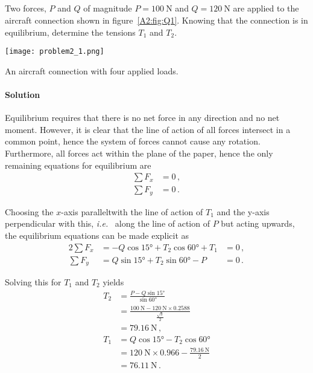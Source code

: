\documentclass[a4paper,justified,oneside]{tufte-handout}
\numberwithin{equation}{subsection}
\begin{document}
\subsection{}
Two forces, $P$ and $Q$ of magnitude $P=\SI{100}{\N}$ and $Q=\SI{120}{\N}$ are applied to the aircraft connection shown in figure~\ref{A2:fig:Q1}. Knowing that the connection is in equilibrium, determine the tensions $T_1$ and $T_2$.
\begin{marginfigure}
	\centering
	\texttt{[image: problem2\_1.png]}
	\caption{An aircraft connection with four applied loads.}
	\label{A2:fig:Q1}
\end{marginfigure}

\begin{solution}
\paragraph{Solution}
Equilibrium requires that there is no net force in any direction and no net moment. However, it is clear that the line of action of all forces intersect in a common point, hence the system of forces cannot cause any rotation. Furthermore, all forces act within the plane of the paper, hence the only remaining equations for equilibrium are
\begin{align*}
	\sum F_x&=0	\,,\\
	\sum F_y&=0 \,.
\end{align*}

Choosing the $x$-axis paralleltwith the line of action of $T_1$ and the y-axis perpendicular with this, \textit{i.e.}~ along the line of action of $P$ but acting upwards, the equilibrium equations can be made explicit as
\begin{alignat*}{2}
	\sum F_x	&=	-Q\cos\ang{15}	+T_2\cos\ang{60}	+T_1	&=	0 \,,	\\
	\sum F_y	&=	Q\sin\ang{15}	+T_2\sin\ang{60}	-P	&=	0 \,.
\end{alignat*}

Solving this for $T_1$ and $T_2$ yields
\begin{align*}
	T_2	&= \frac{P-Q\sin\ang{15}}{\sin\ang{60}}	\\
		&=	\frac{\SI{100}{\N}	-\SI{120}{\N} \times 0.2588}{\frac{\sqrt{3}}{2}}	\\
		&=	\SI{79.16}{\N}	\,,	\\
	T_1	&=	Q\cos\ang{15}	-T_2\cos\ang{60}	\\
		&=	\SI{120}{\N} \times 0.966	-\frac{\SI{79.16}{\N}}{2}	\\
		&=	\SI{76.11}{\N} \,.
\end{align*}
\clearpage
\end{solution}
\end{document}
